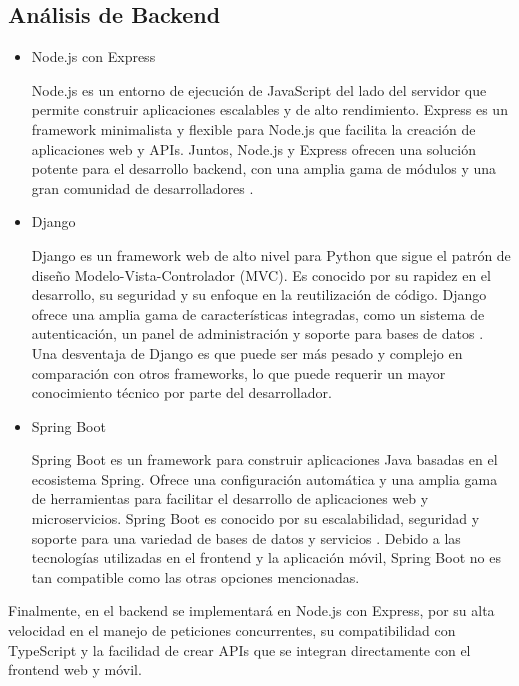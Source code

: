 \subsection{Análisis de Backend}

\begin{itemize}
    \item Node.js con Express
    
    Node.js es un entorno de ejecución de JavaScript del lado del servidor que permite construir aplicaciones escalables y de alto rendimiento. Express es un framework
    minimalista y flexible para Node.js que facilita la creación de aplicaciones web y APIs. Juntos, Node.js y Express ofrecen una solución potente para el desarrollo backend,
    con una amplia gama de módulos y una gran comunidad de desarrolladores \cite{NodeExpress}.

    \item Django
    
    Django es un framework web de alto nivel para Python que sigue el patrón de diseño Modelo-Vista-Controlador (MVC). Es conocido por su rapidez en el desarrollo,
    su seguridad y su enfoque en la reutilización de código. Django ofrece una amplia gama de características integradas, como un sistema de autenticación, un panel de 
    administración y soporte para bases de datos \cite{Django}. Una desventaja de Django es que puede ser más pesado y complejo en comparación con otros frameworks,
    lo que puede requerir un mayor conocimiento técnico por parte del desarrollador.

    \item Spring Boot
    
    Spring Boot es un framework para construir aplicaciones Java basadas en el ecosistema Spring. Ofrece una configuración automática y una amplia gama de herramientas
    para facilitar el desarrollo de aplicaciones web y microservicios. Spring Boot es conocido por su escalabilidad, seguridad y soporte para una variedad de bases de datos 
    y servicios \cite{SpringBoot}. Debido a las tecnologías utilizadas en el frontend y la aplicación móvil, Spring Boot no es tan compatible como las otras opciones 
    mencionadas.
    

\end{itemize}

Finalmente, en el backend se implementará en Node.js con Express, por su alta velocidad en el manejo de peticiones concurrentes, su compatibilidad con TypeScript y 
la facilidad de crear APIs que se integran directamente con el frontend web y móvil.
